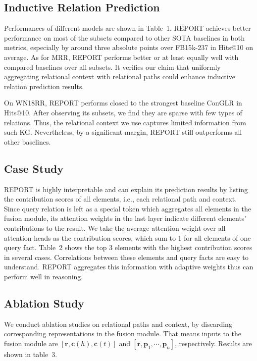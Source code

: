 \documentclass{article}
\begin{document}
\subsection{Inductive Relation Prediction}
Performances of different models are shown in Table~1.
REPORT achieves better performance on most of the subsets compared to other SOTA baselines in both metrics, especially by around three absolute points over FB15k-237 in Hits@10 on average.
As for MRR, REPORT performs better or at least equally well with compared baselines over all subsets. 
It verifies our claim that uniformly aggregating relational context with relational paths could enhance inductive relation prediction results.

On WN18RR, REPORT performs closed to the strongest baseline ConGLR in Hits@10. 
After observing its subsets, we find they are sparse with few types of relations.
Thus, the relational context we use captures limited information from such KG.
Nevertheless, by a significant margin, REPORT still outperforms all other baselines.


\subsection{Case Study}
REPORT is highly interpretable and can explain its prediction results by listing the contribution scores of all elements, i.e., each relational path and context.
Since query relation is left as a special token which aggregates all elements in the fusion module,
its attention weights in the last layer indicate different elements' contributions to the result.
We take the average attention weight over all attention heads as the contribution scores, which sum to 1 for all elements of one query fact.
Table~2 shows the top 3 elements with the highest contribution scores in several cases.
Correlations between these elements and query facts are easy to understand.
REPORT aggregates this information with adaptive weights thus can perform well in reasoning.


\subsection{Ablation Study}
We conduct ablation studies on relational paths and context, by discarding corresponding representations in the fusion module.
That means inputs to the fusion module are $[\mathbf{r},\mathbf{c}(h),\mathbf{c}(t)]$ and $[\mathbf{r},\mathbf{p}_1,\cdots,\mathbf{p}_n]$, respectively.
Results are shown in table~3.
\end{document}

